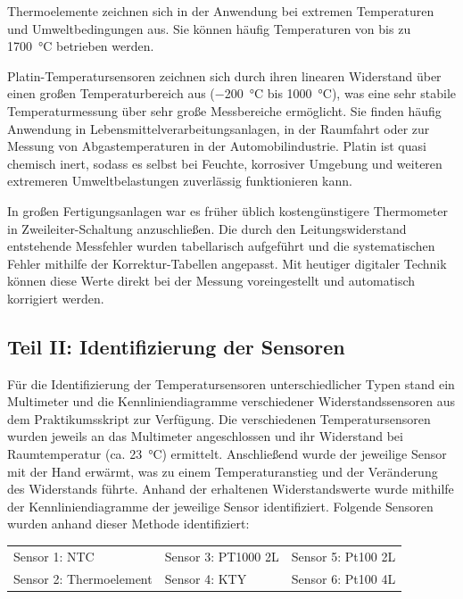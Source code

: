 Thermoelemente zeichnen sich in der Anwendung bei extremen Temperaturen und Umweltbedingungen aus. Sie können häufig Temperaturen von bis zu \SI{1700}{\celsius} betrieben werden.\cite{quelle.2020} 

Platin-Temperatursensoren zeichnen sich durch ihren linearen Widerstand über einen großen Temperaturbereich aus (\SI{-200}{\celsius} bis \SI{1000}{\celsius}), was eine sehr stabile Temperaturmessung über sehr große Messbereiche ermöglicht. Sie finden häufig Anwendung in Lebensmittelverarbeitungsanlagen, in der Raumfahrt oder zur Messung von Abgastemperaturen in der Automobilindustrie. Platin ist quasi chemisch inert, sodass es selbst bei Feuchte, korrosiver Umgebung und weiteren extremeren Umweltbelastungen zuverlässig funktionieren kann.\cite{quelle.2020}

In großen Fertigungsanlagen war es früher üblich kostengünstigere Thermometer in Zweileiter-Schaltung anzuschließen. Die durch den Leitungswiderstand entstehende Messfehler wurden tabellarisch aufgeführt und die systematischen Fehler mithilfe der Korrektur-Tabellen angepasst. Mit heutiger digitaler Technik können diese Werte direkt bei der Messung voreingestellt und automatisch korrigiert werden. 

\subsection{Teil II: Identifizierung der Sensoren}

Für die Identifizierung der Temperatursensoren unterschiedlicher Typen stand ein Multimeter und die Kennliniendiagramme verschiedener Widerstandssensoren aus dem Praktikumsskript zur Verfügung. Die verschiedenen Temperatursensoren wurden jeweils an das Multimeter angeschlossen und ihr Widerstand bei Raumtemperatur (ca. \SI{23}{\celsius}) ermittelt. Anschließend wurde der jeweilige Sensor mit der Hand erwärmt, was zu einem Temperaturanstieg und der Veränderung des Widerstands führte. Anhand der erhaltenen Widerstandswerte wurde mithilfe der Kennliniendiagramme der jeweilige Sensor identifiziert. 
Folgende Sensoren wurden anhand dieser Methode identifiziert:

\begin{table}[H]
	\begin{tabular}{lll}
		Sensor 1: NTC           & Sensor 3: PT1000 2L & Sensor 5: Pt100 2L \\
		Sensor 2: Thermoelement & Sensor 4: KTY    & Sensor 6: Pt100 4L \\
	\end{tabular}
\end{table}

